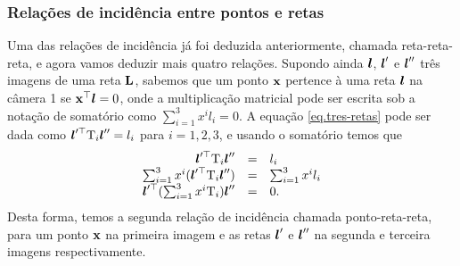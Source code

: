 \subsubsection{Relações de incidência entre pontos e retas}\label{sec.rela-incidi-tri}
Uma das relações de incidência já foi deduzida anteriormente, chamada reta-reta-reta, e agora vamos deduzir mais quatro relações. Supondo ainda $\boldsymbol{l}$, $\boldsymbol{l}'$ e $\boldsymbol{l}''$ três imagens de uma reta ${\bf L}$, sabemos que um ponto $\mathbf{x}$ pertence à uma reta $\boldsymbol{l}$ na câmera 1 se $\mathbf{x}^\top\boldsymbol{l}=0$, onde a multiplicação matricial pode ser escrita sob a notação de somatório como $\sum_{i=1}^{3}x^il_i=0$. A equação \ref{eq.tres-retas} pode ser dada como $\boldsymbol{l}'^\top \mbox{T}_i\boldsymbol{l}''
=l_i$ para $i=1,2,3$, e usando o somatório temos que
\begin{equation*}
\begin{array}{rcl}
\boldsymbol{l}'^\top \mbox{T}_i\boldsymbol{l}''
&=&l_i\\
\sum_{i=1}^3 x^i(\boldsymbol{l}'^\top \mbox{T}_i\boldsymbol{l}'')&=&\sum_{i=1}^3 x^il_i\\
\boldsymbol{l}'^\top(\sum_{i=1}^3 x^i\mbox{T}_i)\boldsymbol{l}''&=&0.
\end{array}
\end{equation*}
Desta forma, temos a segunda relação de incidência chamada ponto-reta-reta, para um ponto $\mathbf{x}$ na primeira imagem e as retas $\boldsymbol{l}'$ e $\boldsymbol{l}''$ na segunda e terceira imagens respectivamente. 

